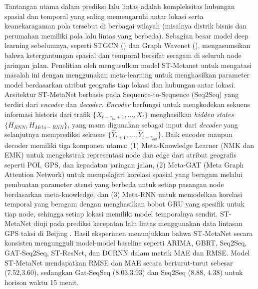 Tantangan utama dalam prediksi lalu lintas adalah kompleksitas hubungan spasial dan temporal yang saling memengaruhi antar lokasi serta keanekaragaman pola tersebut di berbagai wilayah (misalnya distrik bisnis dan perumahan memiliki pola lalu lintas yang berbeda). Sebagian besar model deep learning sebelumnya, seperti STGCN (\cite{Yu2018}) dan Graph Wavenet (\cite{Wu2019}), mengasumsikan bahwa ketergantungan spasial dan temporal bersifat seragam di seluruh node jaringan jalan. Penelitian oleh \cite{Pan2019} mengusulkan model ST-Metanet untuk mengatasi masalah ini dengan menggunakan meta-learning untuk menghasilkan parameter model berdasarkan atribut geografis tiap lokasi dan hubungan antar lokasi. Arsitektur ST-MetaNet berbasis pada Sequence-to-Sequence (Seq2Seq) yang terdiri dari \textit{encoder} dan \textit{decoder}. \textit{Encoder} berfungsi untuk mengkodekan sekuens informasi historis dari trafik $\{X_{t-\tau_{in}+1},\ldots,X_t\}$ menghasilkan \textit{hidden states} $\{H_{RNN}, H_{Meta-RNN}\}$,  yang mana digunakan sebagai input dari \textit{decoder} yang selanjutnya memprediksi sekuens $\{\hat{Y}_{t+1},\ldots, \hat{Y}_{t+\tau_{out}}\}$. Baik encoder maupun decoder memiliki tiga komponen utama: (1) Meta-Knowledge Learner (NMK dan EMK) untuk mengekstrak representasi node dan edge dari atribut geografis seperti POI, GPS, dan kepadatan jaringan jalan, (2) Meta-GAT (Meta Graph Attention Network) untuk mempelajari korelasi spasial yang beragam melalui pembuatan parameter atensi yang berbeda untuk setiap pasangan node berdasarkan meta-knowledge, dan (3) Meta-RNN untuk memodelkan korelasi temporal yang beragam dengan menghasilkan bobot GRU yang spesifik untuk tiap node, sehingga setiap lokasi memiliki model temporalnya sendiri. ST-MetaNet diuji pada prediksi kecepatan lalu lintas menggunakan data lintasan GPS taksi di Beijing . Hasil eksperimen menunjukkan bahwa ST-MetaNet secara konsisten mengungguli model-model baseline seperti ARIMA, GBRT, Seq2Seq, GAT-Seq2Seq, ST-ResNet, dan DCRNN dalam metrik MAE dan RMSE. Model ST-MetaNet mendapatkan RMSE dan MAE secara berturut-turut sebesar (7.52,3.60), sedangkan Gat-SeqSeq (8.03,3.93) dan Seq2Seq (8.88, 4.38) untuk horison waktu 15 menit.

